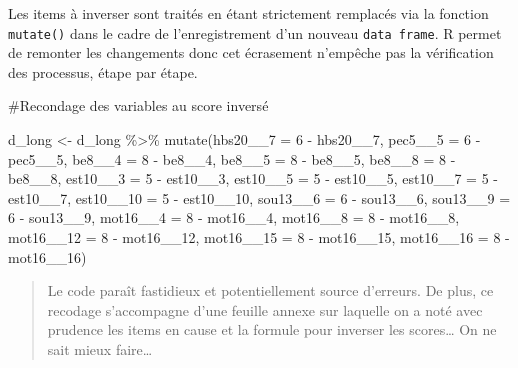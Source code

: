 \documentclass[
  letterpaper,
  DIV=11,
  numbers=noendperiod]{scrreprt}
\newenvironment{Shaded}{\begin{snugshade}}{\end{snugshade}}
\newcommand{\AttributeTok}[1]{\textcolor[rgb]{0.40,0.45,0.13}{#1}}
\newcommand{\CommentTok}[1]{\textcolor[rgb]{0.37,0.37,0.37}{#1}}
\newcommand{\DecValTok}[1]{\textcolor[rgb]{0.68,0.00,0.00}{#1}}
\newcommand{\FunctionTok}[1]{\textcolor[rgb]{0.28,0.35,0.67}{#1}}
\newcommand{\NormalTok}[1]{\textcolor[rgb]{0.00,0.23,0.31}{#1}}
\newcommand{\OtherTok}[1]{\textcolor[rgb]{0.00,0.23,0.31}{#1}}
\newcommand{\SpecialCharTok}[1]{\textcolor[rgb]{0.37,0.37,0.37}{#1}}
\begin{document}
Les items à inverser sont traités en étant strictement remplacés via la
fonction \texttt{mutate()} dans le cadre de l'enregistrement d'un
nouveau \texttt{data\ frame}. R permet de remonter les changements donc
cet écrasement n'empêche pas la vérification des processus, étape par
étape.

\begin{Shaded}
\begin{Highlighting}[]
\CommentTok{\#Recondage des variables au score inversé}

\NormalTok{d\_long }\OtherTok{\textless{}{-}}\NormalTok{ d\_long }\SpecialCharTok{\%\textgreater{}\%} 
  \FunctionTok{mutate}\NormalTok{(}\AttributeTok{hbs20\_\_7 =} \DecValTok{6} \SpecialCharTok{{-}}\NormalTok{ hbs20\_\_7,}
         \AttributeTok{pec5\_\_5 =} \DecValTok{6} \SpecialCharTok{{-}}\NormalTok{ pec5\_\_5,}
         \AttributeTok{be8\_\_4 =} \DecValTok{8} \SpecialCharTok{{-}}\NormalTok{ be8\_\_4,}
         \AttributeTok{be8\_\_5 =} \DecValTok{8} \SpecialCharTok{{-}}\NormalTok{ be8\_\_5,}
         \AttributeTok{be8\_\_8 =} \DecValTok{8} \SpecialCharTok{{-}}\NormalTok{ be8\_\_8,}
         \AttributeTok{est10\_\_3 =} \DecValTok{5} \SpecialCharTok{{-}}\NormalTok{ est10\_\_3,}
         \AttributeTok{est10\_\_5 =} \DecValTok{5} \SpecialCharTok{{-}}\NormalTok{ est10\_\_5,}
         \AttributeTok{est10\_\_7 =} \DecValTok{5} \SpecialCharTok{{-}}\NormalTok{ est10\_\_7,}
         \AttributeTok{est10\_\_10 =} \DecValTok{5} \SpecialCharTok{{-}}\NormalTok{ est10\_\_10,}
         \AttributeTok{sou13\_\_6 =} \DecValTok{6} \SpecialCharTok{{-}}\NormalTok{ sou13\_\_6,}
         \AttributeTok{sou13\_\_9 =} \DecValTok{6} \SpecialCharTok{{-}}\NormalTok{ sou13\_\_9,}
         \AttributeTok{mot16\_\_4 =} \DecValTok{8} \SpecialCharTok{{-}}\NormalTok{ mot16\_\_4,}
         \AttributeTok{mot16\_\_8 =} \DecValTok{8} \SpecialCharTok{{-}}\NormalTok{ mot16\_\_8,}
         \AttributeTok{mot16\_\_12 =} \DecValTok{8} \SpecialCharTok{{-}}\NormalTok{ mot16\_\_12,}
         \AttributeTok{mot16\_\_15 =} \DecValTok{8} \SpecialCharTok{{-}}\NormalTok{ mot16\_\_15,}
         \AttributeTok{mot16\_\_16 =} \DecValTok{8} \SpecialCharTok{{-}}\NormalTok{ mot16\_\_16)}
\end{Highlighting}
\end{Shaded}

\begin{quote}
Le code paraît fastidieux et potentiellement source d'erreurs. De plus,
ce recodage s'accompagne d'une feuille annexe sur laquelle on a noté
avec prudence les items en cause et la formule pour inverser les
scores\ldots{} On ne sait mieux faire\ldots{}
\end{quote}
\end{document}
